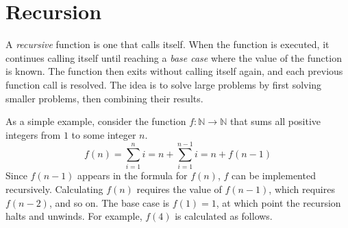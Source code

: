 

\section*{Recursion} %

A \emph{recursive} function is one that calls itself.
When the function is executed, it continues calling itself until reaching a \emph{base case} where the value of the function is known.
The function then exits without calling itself again, and each previous function call is resolved.
The idea is to solve large problems by first solving smaller problems, then combining their results.

As a simple example, consider the function $f:\mathbb{N}\rightarrow\mathbb{N}$ that sums all positive integers from $1$ to some integer $n$.
\[
f(n) = \sum_{i=1}^ni = n + \sum_{i=1}^{n-1}i = n + f(n-1)
\]
Since $f(n-1)$ appears in the formula for $f(n)$, $f$ can be implemented recursively.
Calculating $f(n)$ requires the value of $f(n - 1)$, which requires $f(n - 2)$, and so on.
The base case is $f(1) = 1$, at which point the recursion halts and unwinds.
For example, $f(4)$ is calculated as follows.

